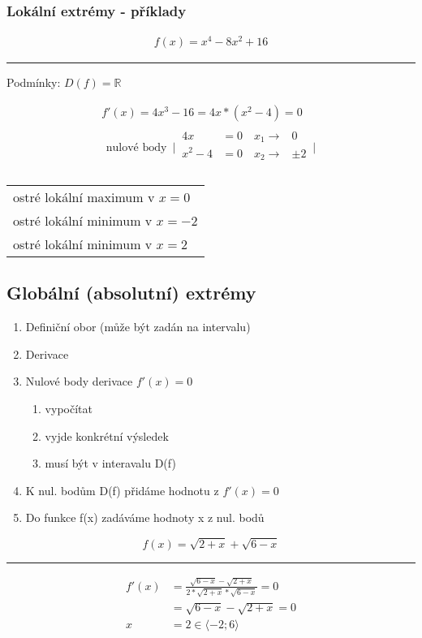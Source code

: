 \subsubsection{Lokální extrémy - příklady}
\begin{align}
  f(x)=x^4-8x^2+16
\end{align}
\hrule
\begin{center}
  Podmínky: $D(f)=\mathbb{R}$
\end{center}
\begin{align*}
  f'(x)=4x^3-16=4x*(x^2-4)=0 \\
  \begin{alignedat}{2}
  \text{nulové body  }\,
  \Biggr|\,
    \begin{alignedat}{2}
      4x &=0 \quad x_1 \rightarrow &0 \\
      x^2-4 &=0 \quad x_2 \rightarrow &\pm2 \\
    \end{alignedat}
  \,\Biggr|
  \end{alignedat}
\end{align*}
\begin{center}
  \begin{tabular}{l}
    ostré lokální maximum v $x=0$\\
    ostré lokální minimum v $x=-2$\\
    ostré lokální minimum v $x=2$
  \end{tabular}
\end{center}

\subsection{Globální (absolutní) extrémy}
\begin{enumerate}
  \item Definiční obor (může být zadán na intervalu)
  \item Derivace
  \item Nulové body derivace $f'(x)=0$
    \begin{enumerate}[label=(\alph*)]
      \item vypočítat
      \item vyjde konkrétní výsledek
      \item musí být v interavalu D(f)
    \end{enumerate}
  \item K nul. bodům D(f) přidáme hodnotu z $f'(x)=0$
  \item Do funkce f(x) zadáváme hodnoty x z nul. bodů
\end{enumerate}
\begin{equation}
  f(x)=\sqrt{2+x}+\sqrt{6-x}
\end{equation}
\hrule
\begin{align*}
  f'(x)&=\frac{\sqrt{6-x}-\sqrt{2+x}}{2*\sqrt{2+x}*\sqrt{6-x}}=0\\
       &=\sqrt{6-x}-\sqrt{2+x}=0\\
       x&=2\in\langle-2;6\rangle
\end{align*}

